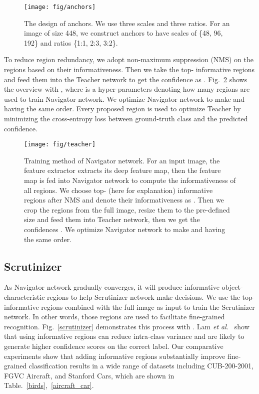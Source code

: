 \documentclass[runningheads]{llncs}
\begin{document}
 

\begin{figure}[ht]
\begin{center}
\texttt{[image: fig/anchors]}
\end{center}
   \caption{The design of anchors. We use three scales and three ratios. For an image of size 448, we construct anchors to have scales of \{48, 96, 192\} and ratios \{1:1, 2:3, 3:2\}.}
\label{anchors}
\end{figure}

To reduce region redundancy, we adopt non-maximum suppression (NMS) on the regions based on their informativeness. Then we take the top- informative regions  and feed them into the Teacher network to get the confidence  as . Fig.~\ref{teacher} shows the overview with , where  is a hyper-parameters denoting how many regions are used to train Navigator network. We optimize Navigator network to make  and  having the same order. Every proposed region is used to optimize Teacher by minimizing the cross-entropy loss between ground-truth class and the predicted confidence.

\begin{figure}[ht]
\begin{center}
\texttt{[image: fig/teacher]}
\end{center}
   \caption{Training method of Navigator network. For an input image, the feature extractor extracts its deep feature map, then the feature map is fed into Navigator network to compute the informativeness of all regions. We choose top- (here  for explanation) informative regions after NMS and denote their informativeness as . Then we crop the regions from the full image, resize them to the pre-defined size and feed them into Teacher network, then we get the confidences . We optimize Navigator network to make  and  having the same order.}
\label{teacher}
\end{figure}

\subsection{Scrutinizer}\label{sec_scrutinizer}
As Navigator network gradually converges, it will produce informative object-characteristic regions to help Scrutinizer network make decisions. We use the top- informative regions combined with the full image as input to train the Scrutinizer network. In other words,  those  regions are used to facilitate fine-grained recognition. Fig.~\ref{scrutinizer} demonstrates this process with . Lam \emph{et al.}~\cite{Lam_2017_CVPR} show that using informative regions can reduce intra-class variance and are likely to generate higher confidence scores on the correct label. Our comparative experiments show that adding informative regions substantially improve fine-grained classification results in a wide range of datasets including CUB-200-2001, FGVC Aircraft, and Stanford Cars, which are shown in Table.~\ref{birds},~\ref{aircraft_car}.
\end{document}
